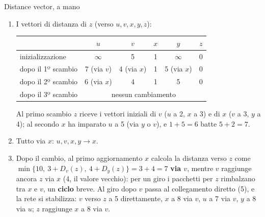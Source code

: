 \begin{esercizio}{Distance vector, a mano}
\svolgimento
\begin{enumerate}[label=(\alph*)]
    \item I vettori di distanza di $z$ (verso $u, v, x, y, z$):
          \begin{center}
          \small
          \begin{tabular}{lccccc}
          \toprule
           & $u$ & $v$ & $x$ & $y$ & $z$ \\
          \midrule
          inizializzazione & $\infty$ & 5 & 1 & $\infty$ & 0 \\
          dopo il 1º scambio & 7 (via $v$) & 4 (via $x$) & 1 & 5 (via $x$) & 0 \\
          dopo il 2º scambio & 6 (via $x$) & 4 & 1 & 5 & 0 \\
          dopo il 3º scambio & \multicolumn{5}{c}{nessun cambiamento} \\
          \bottomrule
          \end{tabular}
          \end{center}
          Al primo scambio $z$ riceve i vettori iniziali di $v$ ($u$ a 2, $x$ a 3) e di $x$ ($v$ a 3, $y$ a 4); al secondo $x$ ha imparato
          $u$ a 5 (via $y$ o $v$), e $1 + 5 = 6$ batte $5 + 2 = 7$.
    \item Tutto via $x$: $u, v, x, y \rightarrow x$.
    \item Dopo il cambio, al primo aggiornamento $x$ calcola la distanza verso $z$ come $\min\{10,\ 3 + D_v(z),\ 4 + D_y(z)\} = 3 + 4 = 7$
          \textbf{via $v$}, mentre $v$ raggiunge ancora $z$ via $x$ (4, il valore vecchio): per un giro i pacchetti per $z$ rimbalzano tra
          $x$ e $v$, un \textbf{ciclo} breve. Al giro dopo $v$ passa al collegamento diretto (5), e la rete si stabilizza: $v$ verso $z$ a 5
          direttamente, $x$ a 8 via $v$, $u$ a 7 via $v$, $y$ a 8 via $u$; $z$ raggiunge $x$ a 8 via $v$.
\end{enumerate}
\end{esercizio}

